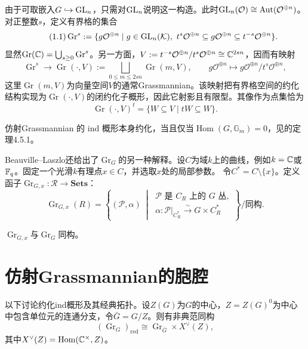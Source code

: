 由于可取嵌入$G\hookrightarrow\operatorname{GL}_n$，只需对$\operatorname{GL}_n$说明这一构造。此时$\operatorname{GL}_n(\mathcal O)\cong\operatorname{Aut}(\mathcal O^{\oplus n})$。对正整数$s$，定义有界格的集合
\begin{equation}\tag{1.1}\label{L21eq11}\operatorname{Gr}^{s}:=\{g\mathcal O^{\oplus n}\mid g\in\operatorname{GL}_n(\mathcal K),\ t^s\mathcal O^{\oplus n}\subseteq g\mathcal O^{\oplus n}\subseteq t^{-s}\mathcal O^{\oplus n}\}.\end{equation}
显然$\operatorname{Gr}(\mathbb{C})=\bigcup_{s\ge0}\operatorname{Gr}^s$。另一方面，$V:=t^{-s}\mathcal O^{\oplus n}/t^s\mathcal O^{\oplus n}\cong\mathbb{C}^{2sn}$，因而有映射
\[\operatorname{Gr}^s\to\operatorname{Gr}(\cdot,V):=\bigsqcup_{0\le m\le2sn}\operatorname{Gr}(m,V),\qquad g\mathcal O^{\oplus n}\longmapsto g\mathcal O^{\oplus n}/t^s\mathcal O^{\oplus n},\]
这里$\operatorname{Gr}(m,V)$为向量空间$V$的通常Grassmannian。该映射把有界格空间的约化结构实现为$\operatorname{Gr}(\cdot,V)$的闭约化子概形，因此它射影且有限型。其像作为点集恰为
\[\operatorname{Gr}(\cdot,V)^t=\{W\subseteq V\mid tW\subseteq W\}.\]

\begin{note}[L21S1O3]仿射Grassmannian 的 ind 概形本身约化，当且仅当$\operatorname{Hom}(G,\mathbb G_m)=0$，见的定理4.5.1。\end{note}
Beauville–Laszlo还给出了$\operatorname{Gr}_G$的另一种解释。设$C$为域$k$上的曲线，例如$k=\mathbb{C}$或$\mathbb{F}_q$。固定一个光滑$k$有理点$x\in C$，并选取$x$处的局部参数。
令$C^*=C\setminus\{x\}$。定义函子$\operatorname{Gr}_{G,x}:\mathcal R\to\mathbf{Sets}$：
\[\operatorname{Gr}_{G,x}(R)=\left\{(\mathcal P,\alpha)\ \middle|\ \begin{array}{l}\mathcal P\text{ 是 }C_R\text{ 上的 }G\text{ 丛},\\\alpha:\mathcal P|_{C^*_R}\xrightarrow{\sim}G\times C^*_R\end{array}\right\}\big/\text{同构}.\]
\begin{theorem}\label{L21S1O4}$\operatorname{Gr}_{G,x}$与$\operatorname{Gr}_G$同构。\end{theorem}
\section{仿射Grassmannian的胞腔}\label{L21S2}
以下讨论约化ind概形及其经典拓扑。设$Z(G)$为$G$的中心，$Z=Z(G)^0$为中心中包含单位元的连通分支，令$\bar G=G/Z$。则有非典范同构
\begin{equation}\tag{2.1}\label{L21eq21}(\operatorname{Gr}_G)_{\mathrm{red}}\cong\operatorname{Gr}_{\bar G}\times X^\vee(Z),\end{equation}
其中$X^\vee(Z)=\operatorname{Hom}(\mathbb{C}^\times,Z)$。

